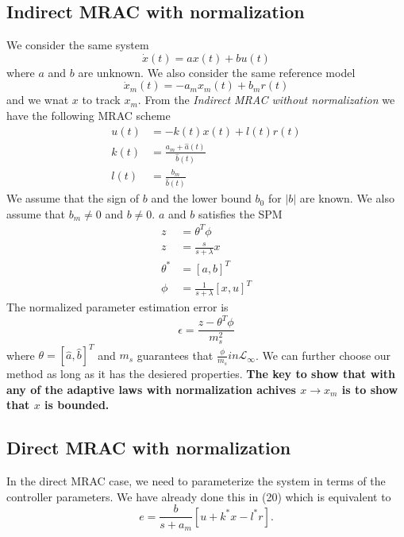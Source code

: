 \documentclass[10pt]{article}
\begin{document}
\begin{multicols*}{2}
\subsection{Indirect MRAC with normalization}
We consider the same system
\begin{equation*}
	\dot x(t) = a x(t) + b u(t)
\end{equation*}
where $a$ and $b$ are unknown. We also consider the same reference model
\begin{equation*}
	\dot x_m(t) = -a_m x_m(t) + b_m r(t)
\end{equation*}
and we wnat $x$ to track $x_m$. From the \textit{Indirect MRAC without normalization} we have the following MRAC scheme
\begin{equation*}
	\begin{split}
		u(t) & = -k(t) x(t) + l(t) r(t)              \\
		k(t) & = \frac{a_m + \hat{a}(t)}{\hat{b}(t)} \\
		l(t) & = \frac{b_m}{\hat{b}(t)}
	\end{split}
\end{equation*}
We assume that the sign of $b$ and the lower bound $b_0$ for $|b|$ are known. We also assume that $b_m \neq 0$ and $b \neq 0$. $a$ and $b$ satisfies the SPM
\begin{equation*}
	\begin{split}
		z         & = \theta^T \phi                  \\
		z         & = \frac{s}{s + \lambda} x        \\
		\theta ^* & = [a, b]^T                       \\
		\phi      & = \frac{1}{s + \lambda} [x, u]^T
	\end{split}
\end{equation*}
The normalized parameter estimation error is
\begin{equation*}
	\epsilon = \frac{z - \theta ^T \phi}{m_s ^2}
\end{equation*}
where $\theta = [\hat{a}, \hat{b}] ^T$ and $m_s$ guarantees that $\frac{\phi}{m_s} in \mathcal{L}_{\infty}$. We can further choose our method as long as it has the desiered properties. \textbf{The key to show that with any of the adaptive laws with normalization achives $x \to x_m$ is to show that $x$ is bounded.}
\subsection{Direct MRAC with normalization}
In the direct MRAC case, we need to parameterize the system in terms of the controller parameters. We have already done this in (20) which is equivalent to
$$
	e=\frac{b}{s+a_m}\left[u+k^* x-l^* r\right] .
$$


\end{multicols*}
\end{document}

